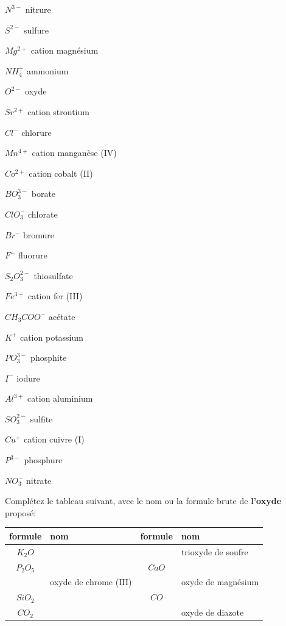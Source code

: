 \documentclass[
  11pt,
  a4paper,
  openany]{book}
\begin{document}
\begin{Answer}

\begin{multicols}{3}
\(N^{3-}\) nitrure

\(S^{2-}\) sulfure

\(Mg^{2+}\) cation magnésium

\(NH_4^{+}\) ammonium

\(O^{2-}\) oxyde

\(Sr^{2+}\) cation strontium

\(Cl^{-}\) chlorure

\(Mn^{4+}\) cation manganèse (IV)

\(Co^{2+}\) cation cobalt (II)

\(BO_3^{3-}\) borate

\(ClO_3^{-}\) chlorate

\(Br^{-}\) bromure

\(F^{-}\) fluorure

\(S_2O_3^{2-}\) thiosulfate

\(Fe^{3+}\) cation fer (III)

\(CH_3COO^{-}\) acétate

\(K^{+}\) cation potassium

\(PO_3^{3-}\) phosphite

\(I^{-}\) iodure

\(Al^{3+}\) cation aluminium

\(SO_3^{2-}\) sulfite

\(Cu^{+}\) cation cuivre (I)

\(P^{3-}\) phosphure

\(NO_3^{-}\) nitrate

\end{multicols}

\end{Answer}

\begin{Exercise}
Complétez le tableau suivant, avec le nom ou la formule brute de \textbf{l'oxyde} proposé:

\end{Exercise}

\begin{longtable}[]{@{}clcl@{}}
\toprule\noalign{}
formule & nom & formule & nom \\
\midrule\noalign{}
\endhead
\bottomrule\noalign{}
\endlastfoot
\(K_2O\) & & & trioxyde de soufre \\
\(P_2O_5\) & & \(CaO\) & \\
& oxyde de chrome (III) & & oxyde de magnésium \\
\(SiO_2\) & & \(CO\) & \\
\(CO_2\) & & & oxyde de diazote \\
\end{longtable}
\end{document}
